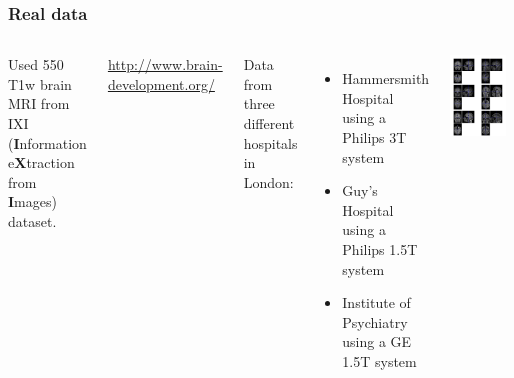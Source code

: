 \begin{frame}
\frametitle{Real data}
\begin{columns}[c]
Used 550 T1w brain MRI from IXI ({\bf I}nformation e{\bf X}traction from {\bf I}mages) dataset.\par
\url{http://www.brain-development.org/}\par
Data from three different hospitals in London:
\begin{itemize}
\item{Hammersmith Hospital using a Philips 3T system}
\item{Guy's Hospital using a Philips 1.5T system}
\item{Institute of Psychiatry using a GE 1.5T system}
\end{itemize}

\includegraphics[width=0.9\textwidth]{orig_ixi}
\end{columns}
\end{frame}



